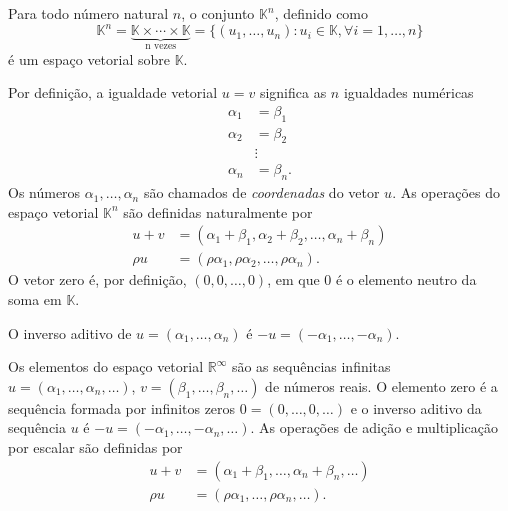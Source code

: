 \begin{exemplo}
  Para todo número natural $n$, o conjunto ${\mathbb{K}}^n$, definido como
  \begin{equation*}
    {\mathbb{K}}^n = \underbrace{{\mathbb{K}} \times \cdots \times {\mathbb{K}}}_{\text{n vezes}} = \{ (u_1,\ldots,u_n) : u_i \in {\mathbb{K}}, \forall i = 1,\ldots, n\}
  \end{equation*}
  é um espaço vetorial sobre ${\mathbb{K}}$.
  
  Por definição, a igualdade vetorial $u=v$ significa as $n$ igualdades numéricas
  \begin{align*}
    \alpha_1 &= \beta_1\\
    \alpha_2 &= \beta_2\\
    &\vdots\\
    \alpha_n &=\beta_n.
  \end{align*} 
  Os números $\alpha_1,\ldots,\alpha_n$ são chamados de \emph{coordenadas} do vetor $u$. As operações do espaço vetorial ${\mathbb{K}}^n$ são definidas naturalmente por
  \begin{align*}
    u+v &= (\alpha_1+\beta_1,\alpha_2+\beta_2,\ldots,\alpha_n+\beta_n)\\
    \rho u &= (\rho \alpha_1, \rho \alpha_2,\ldots,\rho \alpha_n).
  \end{align*}
  O vetor zero é, por definição, $(0,0,\ldots,0)$, em que $0$ é o elemento neutro da soma em ${\mathbb{K}}$.
  
  O inverso aditivo de $u = (\alpha_1,\ldots,\alpha_n)$ é $-u = (-\alpha_1,\ldots,-\alpha_n)$. 
\end{exemplo}

\begin{exemplo}
  Os elementos do espaço vetorial ${\mathbb{R}}^{\infty}$ são as sequências infinitas $u= (\alpha_1,\ldots,\alpha_n,\ldots)$, $v = (\beta_1,\ldots,\beta_n,\ldots)$ de números reais. O elemento zero é a sequência formada por infinitos zeros $0=(0,\ldots,0,\ldots)$ e o inverso aditivo da sequência $u$ é $-u=(-\alpha_1,\ldots,-\alpha_n,\ldots)$. As operações de adição e multiplicação por escalar são definidas por
  \begin{align*}
    u+v &= (\alpha_1+\beta_1,\ldots,\alpha_n+\beta_n,\ldots)\\
    \rho u &= (\rho \alpha_1,\ldots,\rho \alpha_n,\ldots).
  \end{align*}
\end{exemplo}

